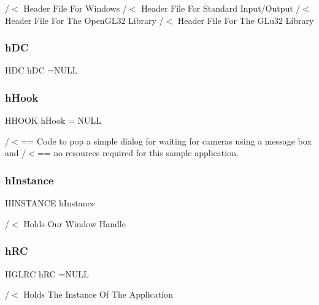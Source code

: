 /$<$ Header File For Windows /$<$ Header File For Standard Input/\+Output /$<$ Header File For The Open\+G\+L32 Library /$<$ Header File For The G\+Lu32 Library \mbox{\label{supportcode_8cpp_a78f6446a0e13adc7b7b2f239112ac785}} 
\subsubsection{h\+DC}
{\footnotesize\ttfamily H\+DC h\+DC =N\+U\+LL}

\mbox{\label{supportcode_8cpp_abac6fbc03119621dc0613441e5cec5fc}} 
\subsubsection{h\+Hook}
{\footnotesize\ttfamily H\+H\+O\+OK h\+Hook = N\+U\+LL}



/$<$== Code to pop a simple dialog for \textquotesingle{}waiting for cameras\textquotesingle{} using a message box and /$<$== no resources required for this sample application. 

\mbox{\label{supportcode_8cpp_a74029128723095e7bf00a71d46af8b24}} 
\subsubsection{h\+Instance}
{\footnotesize\ttfamily H\+I\+N\+S\+T\+A\+N\+CE h\+Instance}



/$<$ Holds Our Window Handle 

\mbox{\label{supportcode_8cpp_a874963259c7cd998acfe6e187fbdb4c1}} 
\subsubsection{h\+RC}
{\footnotesize\ttfamily H\+G\+L\+RC h\+RC =N\+U\+LL}



/$<$ Holds The Instance Of The Application 

\mbox{\label{supportcode_8cpp_afec4341c234519e145bac6f0e5edaa51}} 
